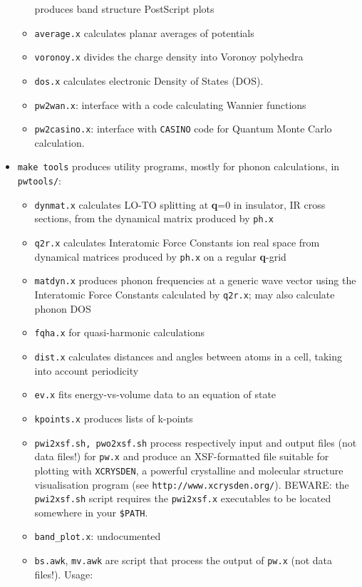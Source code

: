 \documentclass[12pt]{article}
\begin{document}
\begin{itemize}
\begin{itemize}
produces band structure PostScript plots
\item {\tt average.x} calculates planar averages of potentials
\item {\tt voronoy.x} divides the charge density into Voronoy polyhedra
\item {\tt dos.x} calculates electronic Density of States (DOS).
\item {\tt pw2wan.x}: interface with a code calculating Wannier functions
\item {\tt pw2casino.x}: interface with {\tt CASINO} code for Quantum 
Monte Carlo calculation.
\end{itemize}
\item {\tt make tools} produces utility programs, mostly for phonon
calculations, in {\tt pwtools/}:
\begin{itemize}
\item {\tt dynmat.x} calculates LO-TO splitting at {\bf q}=0 in insulator,
IR cross sections, from the dynamical matrix produced by {\tt ph.x}
\item {\tt q2r.x} calculates Interatomic Force Constants ion real space 
from dynamical matrices produced by {\tt ph.x} on a regular {\bf q}-grid
\item {\tt matdyn.x} produces phonon frequencies at a generic wave vector
using the Interatomic Force Constants calculated by {\tt q2r.x}; may also
calculate phonon DOS
\item {\tt fqha.x} for quasi-harmonic calculations
\item {\tt dist.x} calculates distances and angles between atoms in a 
cell, taking into account periodicity
\item {\tt ev.x} fits energy-vs-volume data to an equation of state
\item {\tt kpoints.x} produces lists of k-points
\item {\tt pwi2xsf.sh, pwo2xsf.sh} process respectively input and
  output files (not data files!) for {\tt pw.x} and produce an
  XSF-formatted file suitable for plotting with {\tt XCRYSDEN}, a
  powerful crystalline and molecular structure visualisation program
  (see {\tt http://www.xcrysden.org/}). BEWARE: the {\tt pwi2xsf.sh}
  script requires the {\tt pwi2xsf.x} executables to be located
  somewhere in your {\tt \$PATH}.
\item {\tt band\_plot.x}: undocumented
\item {\tt bs.awk}, {\tt mv.awk} are script that process the output
of {\tt pw.x} (not data files!). Usage: \\

\end{itemize}
\end{itemize}
\end{document}
